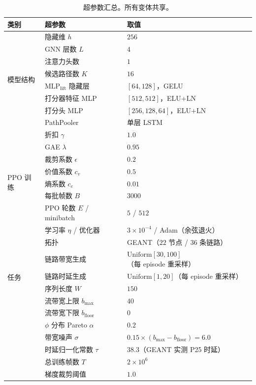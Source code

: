 \begin{table}[t]
\centering
\caption{超参数汇总。所有变体共享。}
\label{tab:hyperparam}
\setlength{\tabcolsep}{4pt}
\begin{tabular}{lll}
\toprule
类别 & 超参数 & 取值 \\
\midrule
\multirow{8}{*}{模型结构}
 & 隐藏维 $h$              & $256$ \\
 & GNN 层数 $L$            & $4$ \\
 & 注意力头数             & $1$ \\
 & 候选路径数 $K$          & $16$ \\
 & $\mathrm{MLP}_{\text{lift}}$ 隐藏层 & $[64,128]$，GELU \\
 & 打分器特征 MLP         & $[512,512]$，ELU$+$LN \\
 & 打分头 MLP             & $[256,128,64]$，ELU$+$LN \\
 & PathPooler            & 单层 LSTM \\
\midrule
\multirow{8}{*}{PPO 训练}
 & 折扣 $\gamma$           & $1.0$ \\
 & GAE $\lambda$          & $0.95$ \\
 & 裁剪系数 $\epsilon$     & $0.2$ \\
 & 价值系数 $c_v$          & $0.5$ \\
 & 熵系数 $c_e$            & $0.01$ \\
 & 每批帧数 $B$            & $3000$ \\
 & PPO 轮数 $E$ / minibatch & $5$ / $512$ \\
 & 学习率 $\eta$ / 优化器   & $3\times10^{-4}$ / Adam（余弦退火）\\
\midrule
\multirow{6}{*}{任务}
 & 拓扑                  & GEANT（$22$ 节点 / $36$ 条链路）\\
 & 链路带宽生成           & $\text{Uniform}[30,100]$（每 episode 重采样）\\
 & 链路时延生成           & $\text{Uniform}[1,20]$（每 episode 重采样）\\
 & 序列长度 $W$            & $150$ \\
 & 流带宽上限 $b_{\text{max}}$ & $40$ \\
 & 流带宽下限 $b_{\text{floor}}$ & $0$ \\
 & $\phi$ 分布 Pareto $\alpha$ & $0.2$ \\
 & 带宽噪声 $\sigma$      & $0.15\times(b_{\text{max}}-b_{\text{floor}})=6.0$ \\
 & 时延归一化常数 $\tau$  & $38.3$（GEANT 实测 P25 时延）\\
 & 总训练帧数 $T$         & $2\times10^{6}$ \\
 & 梯度裁剪阈值           & $1.0$ \\
\bottomrule
\end{tabular}
\end{table}

